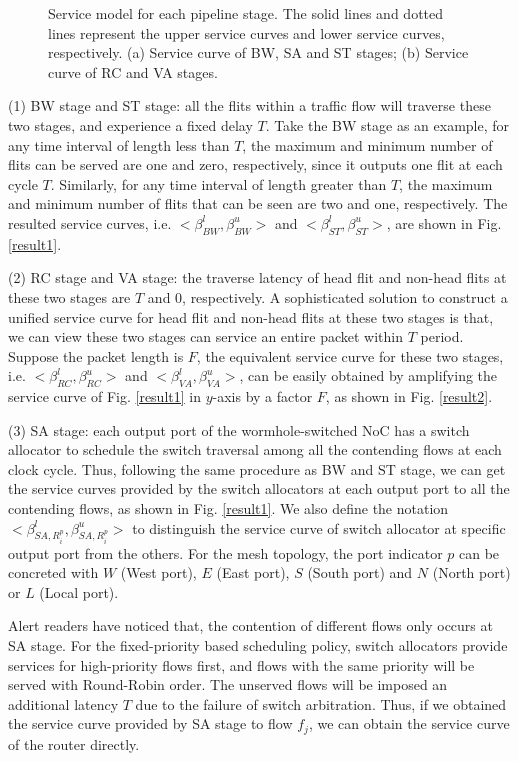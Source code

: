 \documentclass[10pt,journal]{IEEEtran}
\begin{document}
\begin{figure}
  \caption{Service model for each pipeline stage. The solid lines and dotted lines represent the upper service curves and lower service curves, respectively. (a) Service curve of BW, SA and ST stages; (b) Service curve of RC and VA stages.}
\end{figure}

(1) BW stage and ST stage: all the flits within a traffic flow will traverse these two stages, and experience a fixed delay $T$. Take the BW stage as an example, for any time interval of length less than $T$, the maximum and minimum number of flits can be served are one and zero, respectively, since it outputs one flit at each cycle $T$. Similarly, for any time interval of length greater than $T$, the maximum and minimum number of flits that can be seen are two and one, respectively. The resulted service curves, i.e. $<\beta^l_{BW},\beta^u_{BW}>$ and $<\beta^l_{ST},\beta^u_{ST}>$, are shown in Fig. \ref{result1}.

(2) RC stage and VA stage: the traverse latency of head flit and non-head flits at these two stages are $T$ and 0, respectively. A sophisticated solution to construct a unified service curve for head flit and non-head flits at these two stages is that, we can view these two stages can service an entire packet within $T$ period. Suppose the packet length is $F$, the equivalent service curve for these two stages, i.e. $<\beta^l_{RC},\beta^u_{RC}>$ and $<\beta^l_{VA},\beta^u_{VA}>$, can be easily obtained by amplifying the service curve of Fig. \ref{result1} in $y$-axis by a factor $F$, as shown in Fig. \ref{result2}.

(3) SA stage: each output port of the wormhole-switched NoC has a switch allocator to schedule the switch traversal among all the contending flows at each clock cycle. Thus, following the same procedure as BW and ST stage, we can get the service curves provided by the switch allocators at each output port to all the contending flows, as shown in Fig. \ref{result1}. We also define the notation $<\beta_{SA,R_i^{p}}^l,\beta_{SA,R_i^{p}}^u>$ to distinguish the service curve of switch allocator at specific output port from the others. For the mesh topology, the port indicator $p$ can be concreted with $W$ (West port), $E$ (East port), $S$ (South port) and $N$ (North port) or $L$ (Local port).

Alert readers have noticed that, the contention of different flows only occurs at SA stage. For the fixed-priority based scheduling policy, switch allocators provide services for high-priority flows first, and flows with the same priority will be served with Round-Robin order. The unserved flows will be imposed an additional latency $T$ due to the failure of switch arbitration. Thus, if we obtained the service curve provided by SA stage to flow $f_j$, we can obtain the service curve of the router directly.
\end{document}
